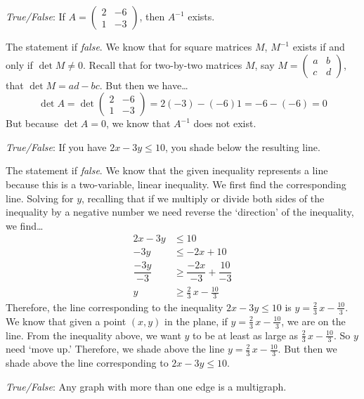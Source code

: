\documentclass[11pt,letterpaper]{article}
\begin{document}
\quizsol \textit{True/False}: If $A= \begin{pmatrix} 2 & -6 \\ 1 & -3 \end{pmatrix}$, then $A^{-1}$ exists. \pspace

\sol The statement if \textit{false}. We know that for square matrices $M$, $M^{-1}$ exists if and only if $\det M \neq 0$. Recall that for two-by-two matrices $M$, say $M= \begin{pmatrix} a & b \\ c & d \end{pmatrix}$, that $\det M= ad - bc$. But then we have\dots
	\[
	\det A= \det \begin{pmatrix} 2 & -6 \\ 1 & -3 \end{pmatrix}= 2(-3) - (-6)1= -6 - (-6)= 0
	\]
But because $\det A= 0$, we know that $A^{-1}$ does not exist. \pvspace{1.3cm}



\quizsol \textit{True/False}: If you have $2x - 3y \leq 10$, you shade below the resulting line. \pspace

\sol The statement if \textit{false}. We know that the given inequality represents a line because this is a two-variable, linear inequality. We first find the corresponding line. Solving for $y$, recalling that if we multiply or divide both sides of the inequality by a negative number we need reverse the `direction' of the inequality, we find\dots
	\[
	\begin{aligned}
	2x - 3y &\leq 10 \\
	-3y&\leq -2x + 10 \\
	\dfrac{-3y}{-3}&\geq \dfrac{-2x}{-3} + \dfrac{10}{-3} \\
	y&\geq \frac{2}{3}\, x - \frac{10}{3}
	\end{aligned}
	\]
Therefore, the line corresponding to the inequality $2x - 3y \leq 10$ is $y= \frac{2}{3}\,x - \frac{10}{3}$. We know that given a point $(x, y)$ in the plane, if $y= \frac{2}{3}\,x - \frac{10}{3}$, we are on the line. From the inequality above, we want $y$ to be at least as large as $\frac{2}{3}\,x - \frac{10}{3}$. So $y$ need `move up.' Therefore, we shade above the line $y= \frac{2}{3}\,x - \frac{10}{3}$. But then we shade above the line corresponding to $2x - 3y \leq 10$. \pvspace{1.3cm} 



\quizsol \textit{True/False}: Any graph with more than one edge is a multigraph. \pspace
\end{document}
